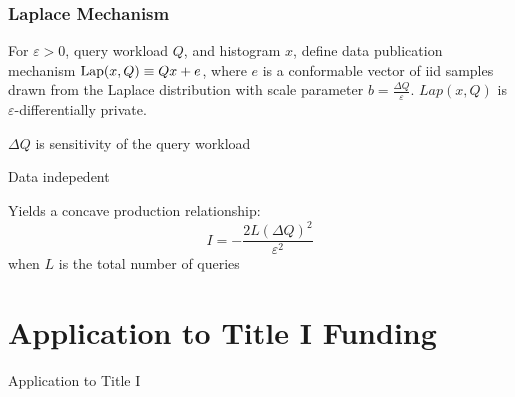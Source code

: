 %

\begin{frame}[allowframebreaks]%
  \frametitle{Laplace Mechanism}
  \begin{theorem}
  \label{prop:laplace_mechanism}
   For $\varepsilon>0$, query workload $Q$, and histogram $x$, define data publication mechanism
   $\mathop{\rm Lap}(x,Q) \equiv Qx + e$,
   where $e$ is a conformable vector of iid samples drawn from the Laplace distribution with scale parameter
   $b=\frac{\Delta Q }{\varepsilon}$.
   $Lap(x,Q)$ is $\varepsilon$-differentially private.
\end{theorem}
\begin{wideitemize}
  \item $\Delta Q$ is sensitivity of the query workload
  \item Data indepedent
  \item Yields a concave production relationship:
  $$ I = -\frac{2L\left(\Delta Q\right)^{2}}{\varepsilon^{2}}$$
  when $L$ is the total number of queries
\end{wideitemize}
\end{frame}%



\section{Application to Title I Funding}
\begin{transitionframe}
  \begin{center}
    \Huge Application to Title I
  \end{center}
\end{transitionframe}

